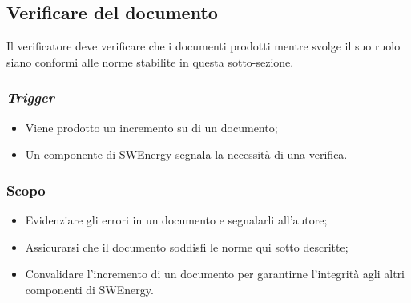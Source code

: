 \subsection{Verificare del documento}
\label{verifica-documento}

Il verificatore deve verificare che i documenti prodotti mentre svolge il suo
ruolo siano conformi alle norme stabilite in questa sotto-sezione.

\subsubsection{\textit{Trigger}}
\begin{itemize}
	\item Viene prodotto un incremento su di un documento;

	\item Un componente di SWEnergy segnala la necessità di una verifica.
\end{itemize}

\subsubsection{Scopo}
\begin{itemize}
	\item Evidenziare gli errori in un documento e segnalarli all'autore;

	\item Assicurarsi che il documento soddisfi le norme qui sotto descritte;

	\item Convalidare l'incremento di un documento per garantirne l'integrità
	      agli altri componenti di SWEnergy.
\end{itemize}

